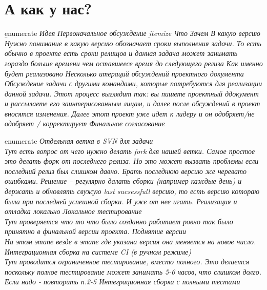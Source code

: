\documentclass[12pt; a4paper]{book}
\theoremstyle{plain} %
\theoremstyle{defenition}
\theoremstyle{remark}
\begin{document}
\section{А как у нас?}
\b{enumerate}
    \it Идея
    \it Первоначальное обсуждение
    \b{itemize}
        \it Что
        \it Зачем
       \it В какую версию\\
       {\normalsize Нужно понимание в какую версию обозначает сроки выполнения задачи. То есть обычно в проекте есть сроки релищов и данная задача может занимать гораздо больше времени чем оставшеесе время до следующего релиза}
        \it Как именно будет реализовано
    \it Несколько итераций обсуждений проектного документа\\
       {\normalsize Обсуждение задачи с другими командами, которые потребуются для реализации данной задачи. Этот процесс выглядит так: вы пишете проектный ддокумент и рассылаете его заинтерисованным лицам, и далее после обсуждений в проект вносятся изменения. Далее этот проект уже идет к лидеру и он одобряет/не одобряет / корректирует}
    \it Финальное согласование

\newpage
{}
\b{enumerate}
    \it Отдельная ветка в SVN для задачи\\
       {\normalsize Тут есть вопрос от чего нужно делать fork для нашей ветки. Самое простое это делать форк от последнего релиза. Но  это может вызвать проблемы если последний релиз был слишком давно. Брать последнюю версию же черевато ошибками. Решение -- регулярно далать сборки (например каждые день)  и держать и обновлять свужую last sucsessfull версию, то есть версию котораю была при последней успешной сборки. И уже от нее игать.}
    \it Реализация и отладка локально
    \it Локальное тестирование\\
       {\normalsize Тут проверяется что то что было созданно работает ровно так было принятно в финальной версии проекта.}
    \it Поднятие версии\\
    {\ns На этом этапе везде в этапе где указана версия она меняется на новое число.}
    \it Интеграционная сборка на системе CI (в ручном режиме)\\
       {\normalsize Тут проводится ограниченное тестирование, вместо полного. Это делается поскольку полное тестирование может занимать 5-6 часов, что слишком долго.}
    \it Если надо - повторить п.2-5
    \it Интеграционная сборка с полными тестами
\end{document}
